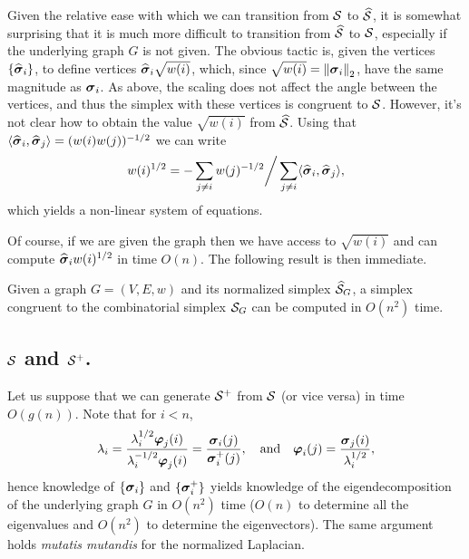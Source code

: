 Given the relative ease with which we can transition from $\mathcal{S}$ to $\widehat{\mathcal{S}}$, it is somewhat surprising that it is much more difficult to transition from $\widehat{\mathcal{S}}$ to  $\mathcal{S}$, especially if the underlying graph $G$ is not given. The obvious tactic is, given the vertices $\{\widehat{\vb*{\sigma}}_i\}$, to define vertices $\widehat{\vb*{\sigma}}_i \sqrt{w(i)}$, which, since $\sqrt{w(i)}=\norm{\vb*{\sigma}_i}_2$, have the same magnitude as $\vb*{\sigma}_i$. As above, the scaling does not affect the angle between the vertices, and thus the simplex with these vertices is congruent to $\mathcal{S}$. However, it's not clear how to obtain the value $\sqrt{w(i)}$ from $\widehat{\mathcal{S}}$. Using that $\langle \widehat{\vb*{\sigma}}_i,\widehat{\vb*{\sigma}}_j\rangle =(w(i)w(j))^{-1/2}$ we can write 
\[w(i)^{1/2} = -\sum_{j\neq i}w(j)^{-1/2} \bigg/ \sum_{j\neq i}\langle \widehat{\vb*{\sigma}}_i,\widehat{\vb*{\sigma}}_j\rangle,\]
which yields a non-linear system of equations. 

Of course, if we are given the graph then we have access to $\sqrt{w(i)}$ and can compute $\widehat{\vb*{\sigma}}_i w(i)^{1/2}$ in time $O(n)$. The following result is then immediate. 

\begin{lemma}
	Given a graph $G=(V,E,w)$ and its normalized simplex $\widehat{\mathcal{S}}_G$, a simplex congruent to  the combinatorial simplex $\mathcal{S}_G$ can be computed in $O(n^2)$ time. 
\end{lemma}




\subsection{\texorpdfstring{$\mathcal{S}$}{The combinatorial} and \texorpdfstring{$\mathcal{S}^+$}{normalized simplex}.}

Let us suppose that we can generate $\mathcal{S}^+$ from $\mathcal{S}$ (or vice versa) in time $O(g(n))$. Note that for $i<n$, 
\[\lambda_i = \frac{\lambda_i^{1/2} \vb*{\varphi}_j(i)}{\lambda_i^{-1/2}\vb*{\varphi}_j(i)} = \frac{\vb*{\sigma}_i(j)}{\vb*{\sigma}_i^+(j)}, \quad \text{and} \quad \vb*{\varphi}_i(j) = \frac{\vb*{\sigma}_j(i)}{\lambda_i^{1/2}},\]
hence knowledge of $\{\vb*{\sigma}_i\}$ and $\{\vb*{\sigma}_i^+\}$ yields knowledge of the eigendecomposition of the underlying graph $G$ in $O(n^2)$ time ($O(n)$ to determine all the  eigenvalues and $O(n^2)$ to determine the eigenvectors). The same argument holds \emph{mutatis mutandis} for the normalized Laplacian. 

